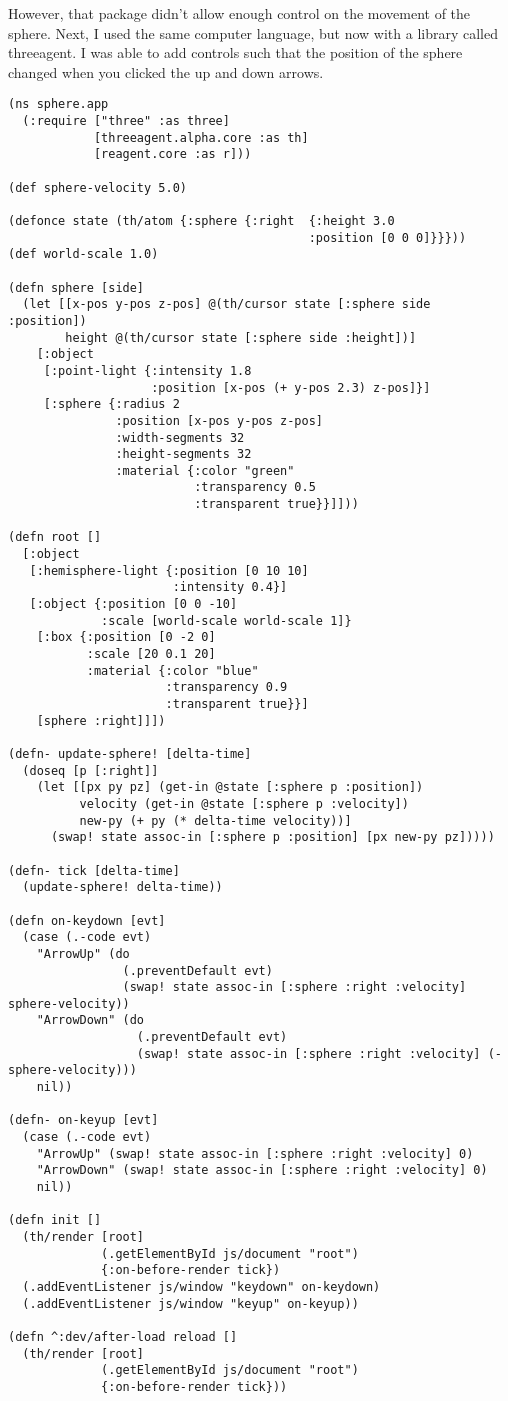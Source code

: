 \documentclass{article}
\begin{document}
However, that package didn't allow enough control on the movement of
the sphere. Next, I used the same computer language, but now with a
library called threeagent. I was able to add controls such that the
position of the sphere changed when you clicked the up and down
arrows.
\begin{verbatim}
(ns sphere.app
  (:require ["three" :as three]
            [threeagent.alpha.core :as th]
            [reagent.core :as r]))

(def sphere-velocity 5.0)

(defonce state (th/atom {:sphere {:right  {:height 3.0
                                          :position [0 0 0]}}}))
(def world-scale 1.0)

(defn sphere [side]
  (let [[x-pos y-pos z-pos] @(th/cursor state [:sphere side :position])
        height @(th/cursor state [:sphere side :height])]
    [:object
     [:point-light {:intensity 1.8
                    :position [x-pos (+ y-pos 2.3) z-pos]}]
     [:sphere {:radius 2
               :position [x-pos y-pos z-pos]
               :width-segments 32
               :height-segments 32
               :material {:color "green"
                          :transparency 0.5
                          :transparent true}}]]))

(defn root []
  [:object
   [:hemisphere-light {:position [0 10 10]
                       :intensity 0.4}]
   [:object {:position [0 0 -10]
             :scale [world-scale world-scale 1]}
    [:box {:position [0 -2 0]
           :scale [20 0.1 20]
           :material {:color "blue"
                      :transparency 0.9
                      :transparent true}}]
    [sphere :right]]])

(defn- update-sphere! [delta-time]
  (doseq [p [:right]]
    (let [[px py pz] (get-in @state [:sphere p :position])
          velocity (get-in @state [:sphere p :velocity])
          new-py (+ py (* delta-time velocity))]
      (swap! state assoc-in [:sphere p :position] [px new-py pz]))))

(defn- tick [delta-time]
  (update-sphere! delta-time))

(defn on-keydown [evt]
  (case (.-code evt)
    "ArrowUp" (do
                (.preventDefault evt)
                (swap! state assoc-in [:sphere :right :velocity] sphere-velocity))
    "ArrowDown" (do
                  (.preventDefault evt)
                  (swap! state assoc-in [:sphere :right :velocity] (- sphere-velocity)))
    nil))

(defn- on-keyup [evt]
  (case (.-code evt)
    "ArrowUp" (swap! state assoc-in [:sphere :right :velocity] 0)
    "ArrowDown" (swap! state assoc-in [:sphere :right :velocity] 0)
    nil))

(defn init []
  (th/render [root]
             (.getElementById js/document "root")
             {:on-before-render tick})
  (.addEventListener js/window "keydown" on-keydown)
  (.addEventListener js/window "keyup" on-keyup))

(defn ^:dev/after-load reload []
  (th/render [root]
             (.getElementById js/document "root")
             {:on-before-render tick}))
\end{verbatim}
\end{document}
